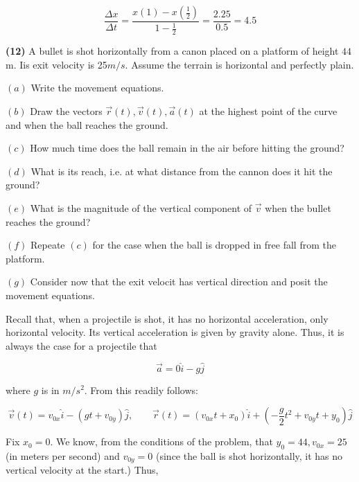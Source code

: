 \documentclass[12pt]{article}
\theoremstyle{definition}
\begin{document}
\begin{equation*}
    \frac{\Delta x}{\Delta t} 
    = \frac{x\left( 1 \right) - x\left( \frac{1}{2} \right)  }{1 - \frac{1}{2}}
    = \frac{2.25}{0.5} = 4.5
\end{equation*}

\pagebreak 

\begin{shaded}
\textbf{(12)} A bullet is shot horizontally from a canon placed on a platform of
height $44$m. Iis exit velocity is 25$m / s$. Assume the terrain is horizontal
and perfectly plain. 

$(a)$ Write the movement equations. 

$(b)$ Draw the vectors $\vec{r}(t), \vec{v}(t), \vec{a}(t)$ at the highest point
of the curve and when the ball reaches the ground. 

$(c)$ How much time does the ball remain in the air before hitting the ground? 

$(d)$ What is its reach, i.e. at what distance from the cannon does it hit the
ground? 

$(e)$ What is the magnitude of the vertical component of $\vec{v}$ when the
bullet reaches the ground? 

$(f)$ Repeate $(c)$ for the case when the ball is dropped in free fall from the
platform. 

$(g)$ Consider now that the exit velocit has vertical direction and posit the
movement equations.
\end{shaded}

Recall that, when a projectile is shot, it has no horizontal acceleration, only
horizontal velocity. Its vertical acceleration is given by gravity alone. Thus,
it is always the case for a projectile that 

\begin{equation*}
    \vec{a} = 0\hat{i} - g \hat{j}
\end{equation*}

where $g$ is in $m / s^2$. From this readily follows: 

\begin{equation*}
    \vec{v}(t) = v_{0x} \hat{i} - (gt + v_{0y}) \hat{j}, \qquad \vec{r}(t) =
    (v_{0x}t + x_0)\hat{i} + (-\frac{g}{2}t^2 + v_{0y}t + y_0)\hat{j}
\end{equation*}

Fix $x_0 = 0$. We know, from the conditions of the problem, that 
$y_0 = 44, v_{0x} = 25$ (in meters per second) and $v_{0y} = 0$ (since the ball
is shot horizontally, it has no vertical velocity at the start.) Thus, 
\end{document}

